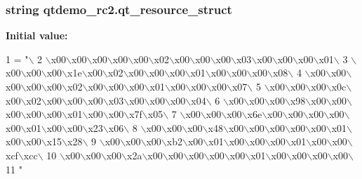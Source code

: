 \subsubsection[{qt\+\_\+resource\+\_\+struct}]{\setlength{\rightskip}{0pt plus 5cm}string qtdemo\+\_\+rc2.\+qt\+\_\+resource\+\_\+struct}\label{namespaceqtdemo__rc2_a6251738e85d17d9809d92d3cd5ba63d0}
{\bfseries Initial value\+:}
\begin{DoxyCode}
1 = \textcolor{stringliteral}{"\(\backslash\)}
2 \textcolor{stringliteral}{\(\backslash\)x00\(\backslash\)x00\(\backslash\)x00\(\backslash\)x00\(\backslash\)x00\(\backslash\)x02\(\backslash\)x00\(\backslash\)x00\(\backslash\)x00\(\backslash\)x03\(\backslash\)x00\(\backslash\)x00\(\backslash\)x00\(\backslash\)x01\(\backslash\)}
3 \textcolor{stringliteral}{\(\backslash\)x00\(\backslash\)x00\(\backslash\)x00\(\backslash\)x1e\(\backslash\)x00\(\backslash\)x02\(\backslash\)x00\(\backslash\)x00\(\backslash\)x00\(\backslash\)x01\(\backslash\)x00\(\backslash\)x00\(\backslash\)x00\(\backslash\)x08\(\backslash\)}
4 \textcolor{stringliteral}{\(\backslash\)x00\(\backslash\)x00\(\backslash\)x00\(\backslash\)x00\(\backslash\)x00\(\backslash\)x02\(\backslash\)x00\(\backslash\)x00\(\backslash\)x00\(\backslash\)x01\(\backslash\)x00\(\backslash\)x00\(\backslash\)x00\(\backslash\)x07\(\backslash\)}
5 \textcolor{stringliteral}{\(\backslash\)x00\(\backslash\)x00\(\backslash\)x00\(\backslash\)x0c\(\backslash\)x00\(\backslash\)x02\(\backslash\)x00\(\backslash\)x00\(\backslash\)x00\(\backslash\)x03\(\backslash\)x00\(\backslash\)x00\(\backslash\)x00\(\backslash\)x04\(\backslash\)}
6 \textcolor{stringliteral}{\(\backslash\)x00\(\backslash\)x00\(\backslash\)x00\(\backslash\)x98\(\backslash\)x00\(\backslash\)x00\(\backslash\)x00\(\backslash\)x00\(\backslash\)x00\(\backslash\)x01\(\backslash\)x00\(\backslash\)x00\(\backslash\)x7f\(\backslash\)x05\(\backslash\)}
7 \textcolor{stringliteral}{\(\backslash\)x00\(\backslash\)x00\(\backslash\)x00\(\backslash\)x6e\(\backslash\)x00\(\backslash\)x00\(\backslash\)x00\(\backslash\)x00\(\backslash\)x00\(\backslash\)x01\(\backslash\)x00\(\backslash\)x00\(\backslash\)x23\(\backslash\)x06\(\backslash\)}
8 \textcolor{stringliteral}{\(\backslash\)x00\(\backslash\)x00\(\backslash\)x00\(\backslash\)x48\(\backslash\)x00\(\backslash\)x00\(\backslash\)x00\(\backslash\)x00\(\backslash\)x00\(\backslash\)x01\(\backslash\)x00\(\backslash\)x00\(\backslash\)x15\(\backslash\)x28\(\backslash\)}
9 \textcolor{stringliteral}{\(\backslash\)x00\(\backslash\)x00\(\backslash\)x00\(\backslash\)xb2\(\backslash\)x00\(\backslash\)x01\(\backslash\)x00\(\backslash\)x00\(\backslash\)x00\(\backslash\)x01\(\backslash\)x00\(\backslash\)x00\(\backslash\)xcf\(\backslash\)xcc\(\backslash\)}
10 \textcolor{stringliteral}{\(\backslash\)x00\(\backslash\)x00\(\backslash\)x00\(\backslash\)x2a\(\backslash\)x00\(\backslash\)x00\(\backslash\)x00\(\backslash\)x00\(\backslash\)x00\(\backslash\)x01\(\backslash\)x00\(\backslash\)x00\(\backslash\)x00\(\backslash\)x00\(\backslash\)}
11 \textcolor{stringliteral}{"}
\end{DoxyCode}

